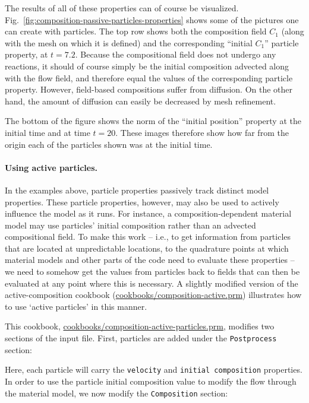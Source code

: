 \documentclass{article}
\begin{document}
The results of all of these properties can of course be visualized.
Fig.~\ref{fig:composition-passive-particles-properties} shows some of the pictures
one can create with particles.
The top row shows both the composition field $C_1$ (along with the mesh on
which it is defined) and the corresponding ``initial $C_1$'' particle property,
at $t=7.2$. Because the compositional field does not undergo any reactions, it should of
course simply be the initial composition advected along with the flow field,
and therefore equal the values of the corresponding particle property. However,
field-based compositions suffer from diffusion. On the other hand, the amount
of diffusion can easily be decreased by mesh refinement.  

The bottom of the figure shows the norm of the ``initial position'' property at
the initial time and at time $t=20$. These images therefore show how far from
the origin each of the particles shown was at the initial time.


\paragraph{Using active particles.}
In the examples above, particle properties passively track distinct
model properties.  These particle properties, however, may also be used
to actively influence the model as it runs.  For instance, a
composition-dependent material model may use particles' initial
composition rather than an advected compositional field. To make this
work -- i.e., to get information from particles that are located at
unpredictable locations, to the quadrature
points at which material models and other parts of the code need to
evaluate these properties -- we need to somehow get the values from
particles back to fields that can then be evaluated at any point where
this is necessary.
A slightly modified version of the active-composition cookbook (\url{cookbooks/composition-active.prm}) illustrates how to use `active particles' in this manner.

This cookbook, \url{cookbooks/composition-active-particles.prm}, modifies two sections of the input file.  First, particles are added under the \texttt{Postprocess} section: 


Here, each particle will carry the \texttt{velocity} and
\texttt{initial composition} properties.  In order to use the particle initial composition value to modify the flow through the material model, we now modify the \texttt{Composition} section:
\end{document}
